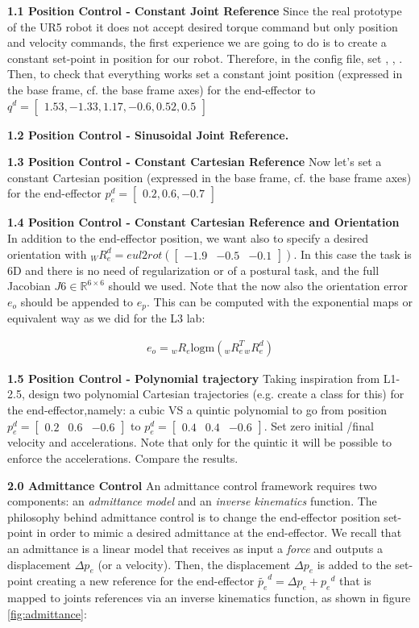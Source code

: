 \documentclass[11pt]{article}
\newcommand{\Rnum}{\mathbb{R}} %
\newcommand{\mat}[1]{\ensuremath{\begin{bmatrix}#1\end{bmatrix}}}	%
\begin{document}
\textbf{1.1 Position Control - Constant Joint Reference}
Since the real prototype of the UR5 robot it does not accept desired torque command but only position and velocity commands, 
the first experience we are going to do is to create a constant set-point in position for our robot. 
Therefore, in the  config file, set ,   , .
Then, to check that everything works set a constant joint position (expressed in the base frame, cf. the base frame axes) for the end-effector to $q^d=\mat{1.53, -1.33, 1.17, -0.6, 0.52, 0.5}$

\textbf{1.2 Position Control - Sinusoidal  Joint Reference.}

\textbf{1.3 Position Control - Constant Cartesian Reference}
Now let's set a constant Cartesian position (expressed in the base frame, cf. 
the base frame axes) for the end-effector $p_e^d=\mat{0.2, 0.6, -0.7}   $


\textbf{1.4 Position Control - Constant Cartesian Reference and Orientation}
In addition to the end-effector position, we want also to specify a desired orientation with ${}_WR_e^d = eul2rot(\mat{-1.9& -0.5& -0.1})$.
In this case the task is 6D and there is no need of regularization or of a postural task, and the full Jacobian $J6 \in \Rnum^{6 \times 6}$ should we used. 
Note that the now also the orientation error $e_o$ should be appended to $e_p$. This can be computed with the exponential maps or equivalent way as we did for the L3 lab: 

\begin{align}
e_o = {}_wR_e \text{logm}({}_wR_e^T {}_wR_e^d)
\end{align}


\textbf{1.5 Position Control - Polynomial trajectory}
Taking inspiration from L1-2.5, design two polynomial Cartesian trajectories (e.g. create a class for this) for the end-effector,namely: a cubic VS a quintic polynomial to go from position $p_e^d=\mat{0.2& 0.6& -0.6}$  to $p_e^d=\mat{0.4& 0.4& -0.6}$. Set zero initial /final velocity and accelerations. Note that only for the quintic it will be possible to enforce the accelerations. Compare the results.


\textbf{2.0 Admittance Control}
An admittance control framework requires two components: an \textit{admittance model} and an \textit{inverse kinematics} function.
The philosophy behind admittance control is to change the end-effector position set-point in order to mimic a desired admittance at the end-effector. We recall that an admittance is a linear model that receives  as input a \textit{force} and outputs a displacement $\Delta p_e$ (or a velocity). Then, the displacement $\Delta p_e$ is added to the set-point creating a new reference for the end-effector $\tilde{p_e}^d = \Delta p_e + {p_e}^d$  that is mapped to joints references via an inverse kinematics function, as shown in figure \ref{fig:admittance}:
\end{document}
